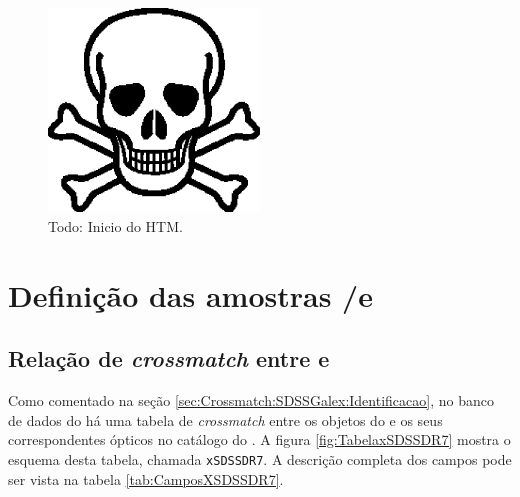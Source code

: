 \begin{figure}
	\includegraphics[width=0.5\textwidth]{figuras/test.eps}
	\caption[Todo: Inicio do HTM.]
	{Todo: Inicio do HTM.}
	\label{fig:HTMInicio}
\end{figure}



\section{Definição das amostras \SDSS/\starlight e \galex}
\label{sec:Crossmatch:DefAmostras}

\subsection{Relação de {\em crossmatch} entre \SDSS e \galex}
Como comentado na seção \ref{sec:Crossmatch:SDSSGalex:Identificacao}, no banco
de dados do \galex há uma tabela de {\em crossmatch} entre os objetos do \galex
e os seus correspondentes ópticos no catálogo do \SDSS. A figura
\ref{fig:TabelaxSDSSDR7} mostra o esquema desta tabela, chamada {\tt xSDSSDR7}.
A descrição completa dos campos pode ser vista na tabela
\ref{tab:CamposXSDSSDR7}.

